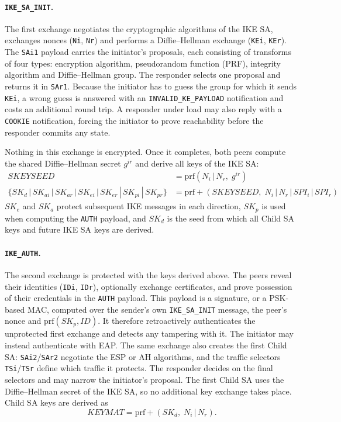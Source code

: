 \paragraph{\texttt{IKE\_SA\_INIT}.}
The first exchange negotiates the cryptographic algorithms of the IKE SA,
exchanges nonces (\texttt{Ni}, \texttt{Nr}) and performs a Diffie--Hellman
exchange (\texttt{KEi}, \texttt{KEr}). The \texttt{SAi1} payload carries the
initiator's proposals, each consisting of transforms of four types:
encryption algorithm, pseudorandom function (PRF), integrity algorithm and
Diffie--Hellman group. The responder selects one proposal and returns it in
\texttt{SAr1}. Because the initiator has to guess the group for which it sends
\texttt{KEi}, a wrong guess is answered with an \texttt{INVALID\_KE\_PAYLOAD}
notification and costs an additional round trip. A responder under load may
also reply with a \texttt{COOKIE} notification, forcing the initiator to prove
reachability before the responder commits any state.

Nothing in this exchange is encrypted. Once it completes, both peers compute
the shared Diffie--Hellman secret $g^{ir}$ and derive all keys of the IKE SA:
\begin{align}
    \mathit{SKEYSEED} &= \mathrm{prf}(N_i \,|\, N_r,\; g^{ir}) \label{eq:skeyseed}\\
    \{SK_d \,|\, SK_{ai} \,|\, SK_{ar} \,|\, SK_{ei} \,|\, SK_{er} \,|\, SK_{pi} \,|\, SK_{pr}\}
        &= \mathrm{prf+}(\mathit{SKEYSEED},\; N_i \,|\, N_r \,|\, SPI_i \,|\, SPI_r)
\end{align}
$SK_{e}$ and $SK_{a}$ protect subsequent IKE messages in each direction,
$SK_{p}$ is used when computing the \texttt{AUTH} payload, and $SK_d$ is the
seed from which all Child SA keys and future IKE SA keys are derived.

\paragraph{\texttt{IKE\_AUTH}.}
The second exchange is protected with the keys derived above. The peers reveal
their identities (\texttt{IDi}, \texttt{IDr}), optionally exchange
certificates, and prove possession of their credentials in the \texttt{AUTH}
payload. This payload is a signature, or a PSK-based MAC, computed over the
sender's own \texttt{IKE\_SA\_INIT} message, the peer's nonce and
$\mathrm{prf}(SK_p, ID)$. It therefore retroactively authenticates the
unprotected first exchange and detects any tampering with it. The initiator
may instead authenticate with EAP. The same exchange also creates the first
Child SA: \texttt{SAi2}/\texttt{SAr2} negotiate the ESP or AH algorithms, and
the traffic selectors \texttt{TSi}/\texttt{TSr} define which traffic it
protects. The responder decides on the final selectors and may narrow the
initiator's proposal. The first Child SA uses the Diffie--Hellman secret of
the IKE SA, so no additional key exchange takes place. Child SA keys are
derived as
\begin{equation}
    \mathit{KEYMAT} = \mathrm{prf+}(SK_d,\; N_i \,|\, N_r). \label{eq:keymat}
\end{equation}

